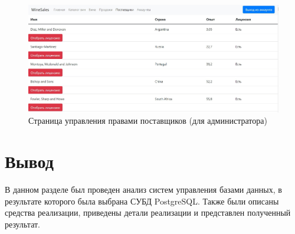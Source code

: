 \begin{figure}[H]
	\begin{center}
		\includegraphics[scale=0.25]{inc/img/suppliers.jpg}
	\end{center}
	\captionsetup{justification=centering}
	\caption{Страница управления правами поставщиков (для администратора)}
	\label{img:suppliers}
\end{figure}
    
\section*{Вывод}

В данном разделе был проведен анализ систем управления базами данных, в результате которого была выбрана СУБД PostgreSQL. Также были описаны средства реализации, приведены детали реализации и представлен полученный результат.